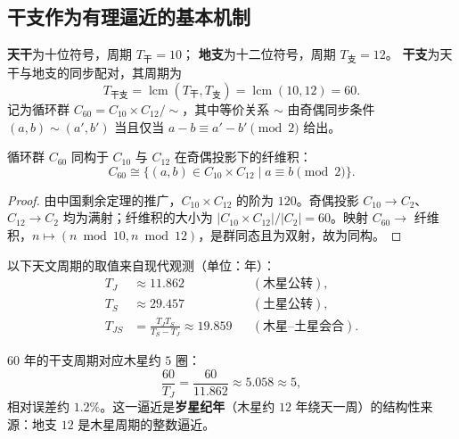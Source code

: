 \subsection{干支作为有理逼近的基本机制}

\begin{definition}[天干周期与地支周期]\label{def:stem_branch_period_yijing}
\textbf{天干}为十位符号，周期 $T_{\text{干}}=10$；
\textbf{地支}为十二位符号，周期 $T_{\text{支}}=12$。
\textbf{干支}为天干与地支的同步配对，其周期为
\[
T_{\text{干支}}=\operatorname{lcm}(T_{\text{干}},T_{\text{支}})=\operatorname{lcm}(10,12)=60.
\]
记为循环群 $C_{60}=C_{10}\times C_{12}/\sim$，其中等价关系 $\sim$ 由奇偶同步条件 $(a,b)\sim(a',b')$ 当且仅当 $a-b\equiv a'-b'\pmod 2$ 给出。
\end{definition}

\begin{proposition}\label{prop:ganzhi_fibre_product_yijing}
循环群 $C_{60}$ 同构于 $C_{10}$ 与 $C_{12}$ 在奇偶投影下的纤维积：
\[
C_{60}\cong\{(a,b)\in C_{10}\times C_{12}\mid a\equiv b\pmod 2\}.
\]
\end{proposition}

\begin{proof}
由中国剩余定理的推广，$C_{10}\times C_{12}$ 的阶为 $120$。奇偶投影 $C_{10}\to C_2$、$C_{12}\to C_2$ 均为满射；纤维积的大小为 $|C_{10}\times C_{12}|/|C_2|=60$。映射 $C_{60}\to$ 纤维积，$n\mapsto(n\bmod 10,n\bmod 12)$，是群同态且为双射，故为同构。
\end{proof}

\begin{definition}[天文周期的经验值]\label{def:planetary_periods_yijing}
以下天文周期的取值来自现代观测（单位：年）：
\[
\begin{aligned}
T_J&\approx 11.862 &&(\text{木星公转}),\\
T_S&\approx 29.457 &&(\text{土星公转}),\\
T_{JS}&=\frac{T_J T_S}{T_S-T_J}\approx 19.859 &&(\text{木星--土星会合}).
\end{aligned}
\]
\end{definition}

\begin{proposition}[年干支对木星的逼近]\label{prop:year_ganzhi_jupiter_yijing}
$60$ 年的干支周期对应木星约 $5$ 圈：
\[
\frac{60}{T_J}=\frac{60}{11.862}\approx 5.058\approx 5,
\]
相对误差约 $1.2\%$。这一逼近是\textbf{岁星纪年}（木星约 $12$ 年绕天一周）的结构性来源：地支 $12$ 是木星周期的整数逼近。
\end{proposition}

